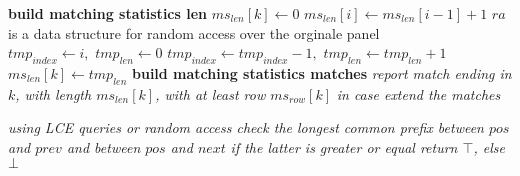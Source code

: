 \documentclass[a4paper,12pt, oneside]{book}
\begin{document}
\begin{algorithm}
\begin{algorithmic}[1]
    \EndIf
    \EndFor
    \Comment \textbf{build matching statistics len}
    \For {\textit{every} $k\in[0,|ms_{row}|)$}
    \State $ms_{len}[k]\gets 0$
    \State $ms_{len}[i]\gets ms_{len}[i-1]+1$
    \Else
    \Comment $ra$ is a data structure for random access over the orginale panel
    \State $tmp_{index}\gets i,\,\,tmp_{len}\gets 0$
    \State $tmp_{index}\gets tmp_{index}-1,\,\,tmp_{len}\gets tmp_{len}+1$
    \EndWhile
    \State $ms_{len}[k]\gets tmp_{len}$
    \EndIf
    \EndFor
    \For {\textit{every} $k\in[0,|ms_{row}|)$}
    \Comment \textbf{build matching statistics matches}
    \State \textit{report match ending in $k$, with length $ms_{len}[k]$, with
    at least row $ms_{row}[k]$}
    \EndIf
    \EndFor
    \textit{in case extend the matches}
    \EndFunction
  \end{algorithmic}
  \caption{Algoritmo per match con matching-statistics (MS) e thresholds}
\end{algorithm}
\begin{algorithm}
  \begin{algorithmic}
    \State \textit{using LCE queries or random access check the longest common
    prefix between $pos$ and $prev$ and between $pos$ and $next$}
    \State \textit{if the latter is greater or equal return $\top$, else $\bot$}
    \EndFunction
  \end{algorithmic}
\end{algorithm}
\end{document}
